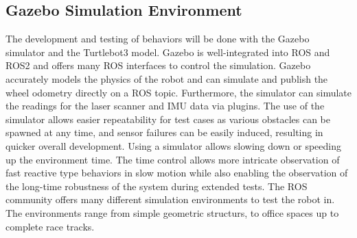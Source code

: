 
\subsection{Gazebo Simulation Environment}
The development and testing of behaviors will be done with the Gazebo simulator and the Turtlebot3 model. Gazebo is well-integrated into ROS and ROS2 and offers many ROS interfaces to control the simulation. Gazebo accurately models the physics of the robot and can simulate and publish the wheel odometry directly on a ROS topic. Furthermore, the simulator can simulate the readings for the laser scanner and IMU data via plugins. The use of the simulator allows easier repeatability for test cases as various obstacles can be spawned at any time, and sensor failures can be easily induced, resulting in quicker overall development.
Using a simulator allows slowing down or speeding up the environment time. The time control allows more intricate observation of fast reactive type behaviors in slow motion while also enabling the observation of the long-time robustness of the system during extended tests. 
The ROS community offers many different simulation environments to test the robot in. The environments range from simple geometric structurs, to office spaces up to complete race tracks. 


